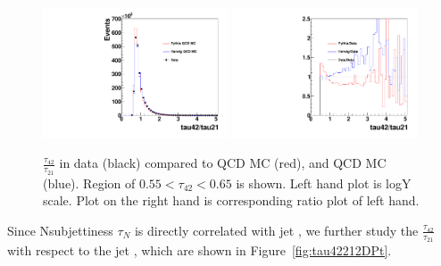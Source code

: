 \begin{figure}[htb]
\begin{center}
\includegraphics[width=0.49\textwidth,angle=0]{figs/SFExtra/SFSameJetRatioPlot55L.pdf}
\includegraphics[width=0.49\textwidth,angle=0]{figs/SFExtra/SFRatioRatioPlot55L.pdf}
\end{center}
\caption{
$\frac{\tau_{42}}{\tau_{21}}$ in data (black) compared to \PYTHIA QCD MC (red), and 
\HERWIG QCD MC (blue). Region of $0.55 < \tau_{42} < 0.65$ is shown. 
Left hand plot is logY scale. Plot on the right hand is corresponding 
ratio plot of left hand.  
}
\label{fig:tau4221samejetL}
\end{figure}

\clearpage
\newpage



Since Nsubjettiness $\tau_{N}$ is directly correlated with jet \pt, we further study
the $\frac{\tau_{42}}{\tau_{21}}$ with respect to the jet \pt, which are shown in 
Figure~\ref{fig:tau42212DPt}. 

